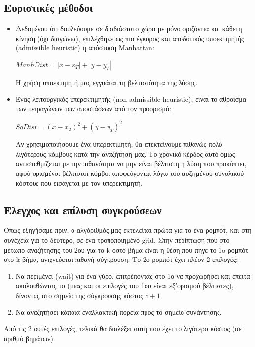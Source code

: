 \documentclass[a4paper,9pt]{article}
\begin{document}

\subsection{Ευριστικές μέθοδοι}
\begin{itemize}
    \item
        Δεδομένου ότι δουλεύουμε σε δισδιάστατο χώρο με μόνο οριζόντια και κάθετη
        κίνηση (όχι διαγώνια), επιλέχθηκε ως πιο έγκυρος και αποδοτικός υποεκτιμητής
        (admissible heuris{\kern0pt}tic) η απόσταση Manhattan:
        \begin{center} $ManhDist = |x - x_T| + |y - y_T|$ \end{center}
        Η χρήση υποεκτιμητή μας εγγυάται τη βελτιστότητα της λύσης.

    \item
        Ένας λειτουργικός υπερεκτιμητής (non-admissible heuris{\kern0pt}tic), είναι το άθροισμα
        των τετραγώνων των αποστάσεων από τον προορισμό:
        \begin{center} $SqDist = (x - x_T)^2 + (y - y_T)^2$ \end{center}
        Αν χρησιμοποιήσουμε ένα υπερεκτιμητή, θα επεκτείνουμε πιθανώς πολύ λιγότερους
        κόμβους κατά την αναζήτηση μας. Το χρονικό κέρδος αυτό όμως αντισταθμίζεται με
        την πιθανότητα να μην είναι βέλτιστη η λύση που προκύπτει, αφού ορισμένοι
        βέλτιστοι κόμβοι αποφεύγονται λόγω του αυξημένου συνολικού κόστους που
        εισάγεται με τον υπερεκτιμητή.
\end{itemize}



\subsection{Έλεγχος και επίλυση συγκρούσεων}
Όπως εξηγήσαμε πριν, ο αλγόριθμός μας εκτελείται πρώτα για το ένα ρομπότ, και
στη συνέχεια για το δεύτερο, σε ένα τροποποιημένο grid. Στην περίπτωση που στο
μέτωπο αναζήτησης του 2ου για το k-οστό βήμα είναι η θέση που πήγε το 1o
ρομπότ στο k βήμα, ανιχνεύεται πιθανή σύγκρουση. Το 2ο ρομπότ έχει πλέον 2
επιλογές:
\begin{enumerate}
    \item Να περιμένει (wait) για ένα γύρο, επιτρέποντας στο 1ο να προχωρήσει
        και έπειτα ακολουθώντας το (μιας και οι επιλογές του 1ου είναι εξ'ορισμού
        βέλτιστες), δίνοντας στο σημείο της σύγκρουσης κόστος $c+1$
    \item Να αναζητήσει κάποια εναλλακτική πορεία προς το σημείο συνάντησης.
\end{enumerate}
Από τις 2 αυτές επιλογές, τελικά θα διαλέξει αυτή που έχει το λιγότερο κόστος
(σε αριθμό βημάτων)
\end{document}
